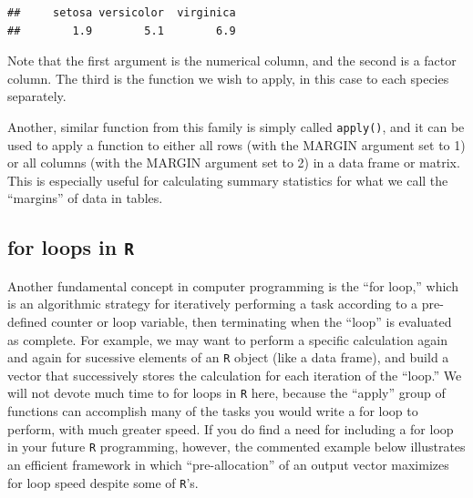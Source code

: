 \documentclass[]{book}
\newenvironment{Shaded}{\begin{snugshade}}{\end{snugshade}}
\newcommand{\CommentTok}[1]{\textcolor[rgb]{0.56,0.35,0.01}{\textit{#1}}}
\newcommand{\KeywordTok}[1]{\textcolor[rgb]{0.13,0.29,0.53}{\textbf{#1}}}
\newcommand{\NormalTok}[1]{#1}
\newcommand{\OperatorTok}[1]{\textcolor[rgb]{0.81,0.36,0.00}{\textbf{#1}}}
\begin{document}
\begin{Shaded}
\end{Shaded}

\begin{verbatim}
##     setosa versicolor  virginica 
##        1.9        5.1        6.9
\end{verbatim}

Note that the first argument is the numerical column, and the second is a factor column. The third is the function we wish to apply, in this case to each species separately.

Another, similar function from this family is simply called \texttt{apply()}, and it can be used to apply a function to either all rows (with the MARGIN argument set to 1) or all columns (with the MARGIN argument set to 2) in a data frame or matrix. This is especially useful for calculating summary statistics for what we call the ``margins'' of data in tables.

\hypertarget{for-loops-in-r}{%
\subsection{\texorpdfstring{for loops in \texttt{R}}{for loops in R}}\label{for-loops-in-r}}

Another fundamental concept in computer programming is the ``for loop,'' which is an algorithmic strategy for iteratively performing a task according to a pre-defined counter or loop variable, then terminating when the ``loop'' is evaluated as complete. For example, we may want to perform a specific calculation again and again for sucessive elements of an \texttt{R} object (like a data frame), and build a vector that successively stores the calculation for each iteration of the ``loop.'' We will not devote much time to for loops in \texttt{R} here, because the ``apply'' group of functions can accomplish many of the tasks you would write a for loop to perform, with much greater speed. If you do find a need for including a for loop in your future \texttt{R} programming, however, the commented example below illustrates an efficient framework in which ``pre-allocation'' of an output vector maximizes for loop speed despite some of \texttt{R}'s.
\end{document}
